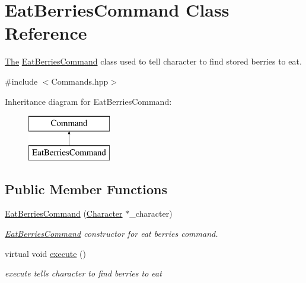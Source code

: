 \hypertarget{class_eat_berries_command}{}\section{Eat\+Berries\+Command Class Reference}
\label{class_eat_berries_command}


\hyperlink{namespace_the}{The} \hyperlink{class_eat_berries_command}{Eat\+Berries\+Command} class used to tell character to find stored berries to eat.  




{\ttfamily \#include $<$Commands.\+hpp$>$}

Inheritance diagram for Eat\+Berries\+Command\+:\begin{figure}[H]
\begin{center}
\leavevmode
\includegraphics[height=2.000000cm]{class_eat_berries_command}
\end{center}
\end{figure}
\subsection*{Public Member Functions}
\begin{DoxyCompactItemize}
\item 
\hyperlink{class_eat_berries_command_a473d3703721deb37b52f9f3551bc1e7e}{Eat\+Berries\+Command} (\hyperlink{class_character}{Character} $\ast$\+\_\+character)
\begin{DoxyCompactList}\small\item\em \hyperlink{class_eat_berries_command}{Eat\+Berries\+Command} constructor for eat berries command. \end{DoxyCompactList}\item 
\hypertarget{class_eat_berries_command_a205f193f75c5cf8be423581614983c45}{}virtual void \hyperlink{class_eat_berries_command_a205f193f75c5cf8be423581614983c45}{execute} ()\label{class_eat_berries_command_a205f193f75c5cf8be423581614983c45}

\begin{DoxyCompactList}\small\item\em execute tells character to find berries to eat \end{DoxyCompactList}\end{DoxyCompactItemize}


